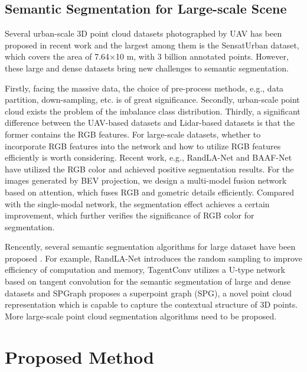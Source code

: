 \documentclass[conference]{IEEEtran}
\begin{document}
\subsection{Semantic Segmentation for Large-scale Scene }
Several urban-scale 3D point cloud datasets 
\cite{Hu2020TowardsSS,Li2020Campus3DAP,Can2020SemanticSO}
photographed by UAV
has been proposed in recent work 
and the largest among them is the SensatUrban \cite{Hu2020TowardsSS} dataset, which covers the area of 7.64×10 m, with 3 billion annotated points. However, these large and dense datasets bring new challenges to semantic segmentation.

Firstly, facing the massive data, the choice of pre-process methods, e.g., data partition, down-sampling, etc. is of great significance.
Secondly, urban-scale point cloud exists the problem of the imbalance class distribution. 
Thirdly, a significant difference between the UAV-based datasets and Lidar-based datasets is that the former contains the RGB features. 
For large-scale datasets, whether to incorporate RGB features into the network and how to utilize RGB features efficiently is worth considering. Recent work, e.g., RandLA-Net \cite{Hu2020RandLANetES} and BAAF-Net \cite{Qiu2021SemanticSF} have utilized the RGB color and achieved positive segmentation results.
For the images generated by BEV projection, we design a multi-model fusion network based on attention, which fuses RGB and gometric details efficiently. Compared with the single-modal network, the segmentation effect achieves a certain improvement, which further verifies the significance of RGB color for segmentation.


Rencently, several semantic segmentation algorithms for large dataset have been proposed \cite{Hu2020RandLANetES,Liu2020FGNetFL,Tatarchenko2018TangentCF,Landrieu2018LargeScalePC}.
For example, RandLA-Net \cite{Hu2020RandLANetES} introduces the random sampling to improve efficiency of computation and memory, TagentConv \cite{Tatarchenko2018TangentCF} utilizes a U-type network based on tangent convolution for the semantic segmentation of large and dense datasets and SPGraph \cite{Landrieu2018LargeScalePC} proposes a superpoint graph (SPG), a novel point cloud representation which is capable to capture the contextual structure of 3D points. More large-scale point cloud segmentation algorithms need to be proposed.


\section{Proposed Method}
\end{document}
